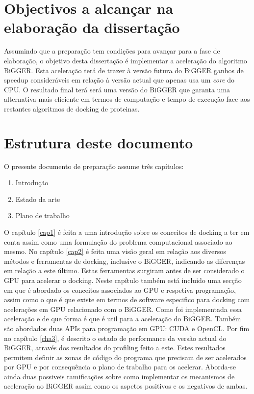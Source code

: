 \section{Objectivos a alcançar na elaboração da dissertação}
Assumindo que a preparação tem condições para avançar para a fase de elaboração, o objetivo desta dissertação é implementar a aceleração do algoritmo BiGGER. Esta aceleração terá de trazer à versão futura do BiGGER ganhos de speedup consideráveis em relação à versão actual que apenas usa um \textit{core} do CPU. O resultado final terá será uma versão do BiGGER que garanta uma alternativa mais eficiente em termos de computação e tempo de execução face aos restantes algoritmos de docking de proteinas.
\section{Estrutura deste documento}
O presente documento de preparação assume três capítulos:
\begin{enumerate}
\item{Introdução}
\item{Estado da arte}
\item{Plano de trabalho}
\end{enumerate}

O capítulo \ref{cap1} é feita a uma introdução sobre os conceitos de docking a ter em conta assim como uma formulação do problema computacional associado ao mesmo. No capítulo \ref{cap2} é feita uma visão geral em relação aos diversos métodos e ferramentas de docking, inclusive o BiGGER, indicando as diferenças em relação a este último. Estas ferramentas surgiram antes de ser considerado o GPU para acelerar o docking. Neste capítulo também está incluido uma secção em que é abordado os conceitos associados ao GPU e respetiva programação, assim como o que é que existe em termos de software especifico para docking com acelerações em GPU relacionado com o BiGGER. Como foi implementada essa aceleração e de que forma é que é util para a aceleração do BiGGER. Também são abordados duas APIs para programação em GPU: CUDA e OpenCL.
Por fim no capítulo \ref{cha3}, é descrito o estado de performance da versão actual do BiGGER, através dos resultados do profiling feito a este. Estes resultados permitem definir as zonas de código do programa que precisam de ser acelerados por GPU e por consequência o plano de trabalho para os acelerar. Aborda-se ainda duas possiveis ramificações sobre como implementar os mecanismos de aceleração ao BiGGER assim como os aspetos positivos e os negativos de ambas. 


